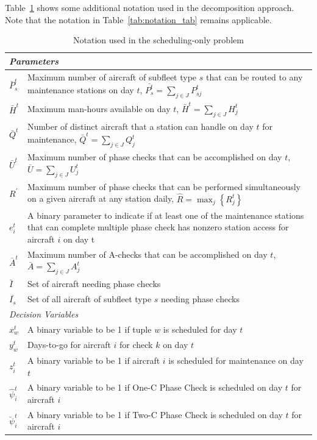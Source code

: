 Table~\ref{tab:notation_tabDecomp} shows some additional notation used in the decomposition approach. Note that the notation in Table~\ref{tab:notation_tab} remains applicable.




\begin{table}[ht]
\centering
\caption{Notation used in the scheduling-only problem}
\label{tab:notation_tabDecomp}
\begin{tabular}{lp{16cm}} 
\toprule
\multicolumn{2}{l}{\textit{Parameters}} \\ 
\hline
$\bar{P}_{s}^t$ & Maximum number of aircraft of subfleet type $s$ that can be routed to any maintenance stations on day $t$, $\bar{P_{s}^t} =\sum_{j\in J}P_{sj}^t$ \\
$\bar{H}^t$ & Maximum man-hours available on day $t$, $\bar{H}^t =\sum_{j\in J}H_j^t$ \\
$\bar{Q}^t$ & Number of distinct aircraft that a station can handle on day $t$ for maintenance, $\bar{Q}^t =\sum_{j\in J}Q_j^t$ \\
$\bar{U}^t$ & Maximum number of phase checks that can be accomplished on day $t$, $\bar{U} =\sum_{j\in J}U_j^t$ \\
$R^\prime$ & Maximum number of phase checks that can be performed simultaneously on a given aircraft at any station daily, $\hat{R} = \max_j\left\{R_j^t\right\}$ \\
$e_i^t$ & A binary parameter to indicate if at least one of the maintenance stations that can complete multiple phase check has nonzero station access for aircraft $i$ on day t \\
$\bar{A}^t$ & Maximum number of A-checks that can be accomplished on day $t$, $\bar{A} =\sum_{j\in J} A_j^t$ \\
$\bar{I}$ & Set of aircraft needing phase checks \\ 
$\bar{I_s}$ &  Set of all aircraft of subfleet type $s$ needing phase checks \\ 
\hline
\multicolumn{2}{l}{\textit{Decision Variables}} \\ 
\hline
$x_w^t$ & A binary variable to be 1 if tuple $w$ is scheduled for day $t$ \\
$y_w^t$ & Days-to-go for aircraft $i$ for check $k$ on day $t$ \\
$z_i^t$ & A binary variable to be 1 if aircraft $i$ is scheduled for maintenance on day $t$ \\
$\hat{\psi}_i^t$ & A binary variable to be 1 if One-C Phase Check is scheduled on day $t$ for aircraft $i$ \\
$\breve{\psi}_i^t$ & A binary variable to be 1 if Two-C Phase Check is scheduled on day $t$ for aircraft $i$ \\ \bottomrule
\end{tabular}
\end{table}

